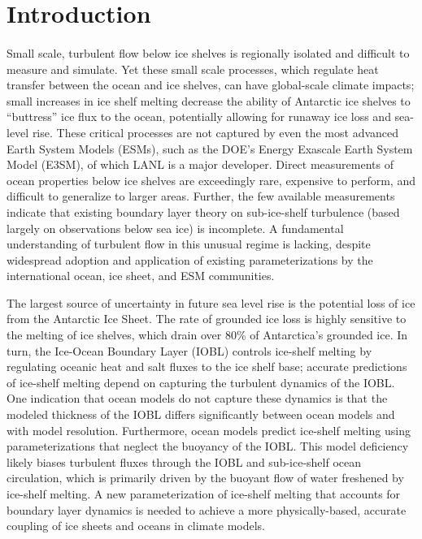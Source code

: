 \documentclass[draft]{styles/agujournal2019}
\begin{document}


\section{Introduction}

\paragraph{}%
Small scale, turbulent flow below ice shelves is regionally isolated and difficult to measure and simulate.  Yet these small scale processes, which regulate heat transfer between the ocean and ice shelves, can have global-scale climate impacts; small increases in ice shelf melting decrease the ability of Antarctic ice shelves to “buttress” ice flux to the ocean, potentially allowing for runaway ice loss and sea-level rise.  These critical processes are not captured by even the most advanced Earth System Models (ESMs), such as the DOE’s Energy Exascale Earth System Model (E3SM), of which LANL is a major developer. Direct measurements of ocean properties below ice shelves are exceedingly rare, expensive to perform, and difficult to generalize to larger areas. Further, the few available measurements indicate that existing boundary layer theory on sub-ice-shelf turbulence (based largely on observations below sea ice) is incomplete. A fundamental understanding of turbulent flow in this unusual regime is lacking, despite widespread adoption and application of existing parameterizations by the international ocean, ice sheet, and ESM communities.

The largest source of uncertainty in future sea level rise is the potential loss of ice from the Antarctic Ice Sheet. The rate of grounded ice loss is highly sensitive to the melting of ice shelves, which drain over 80\% of Antarctica’s grounded ice. In turn, the Ice-Ocean Boundary Layer (IOBL) controls ice-shelf melting by regulating oceanic heat and salt fluxes to the ice shelf base; accurate predictions of ice-shelf melting depend on capturing the turbulent dynamics of the IOBL. One indication that ocean models do not capture these dynamics is that the modeled thickness of the IOBL differs significantly between ocean models and with model resolution. Furthermore, ocean models predict ice-shelf melting using parameterizations that neglect the buoyancy of the IOBL. This model deficiency likely biases turbulent fluxes through the IOBL and sub-ice-shelf ocean circulation, which is primarily driven by the buoyant flow of water freshened by ice-shelf melting. A new parameterization of ice-shelf melting that accounts for boundary layer dynamics is needed to achieve a more physically-based, accurate coupling of ice sheets and oceans in climate models.
\end{document}
